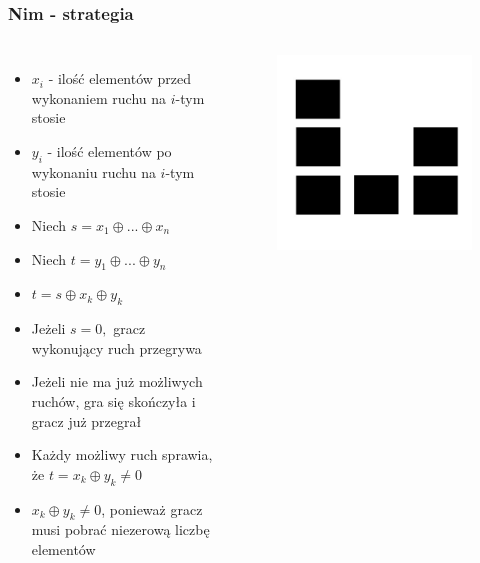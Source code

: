 \documentclass[polish,envcountsect,10pt]{beamer}
\begin{document}
                \begin{frame}
                    \frametitle{Nim - strategia}
                    \begin{columns}
                            \begin{itemize}
                                \item<1-> $x_i$ - ilość elementów przed wykonaniem ruchu na $i$-tym stosie
                                \item<1-> $y_i$ - ilość elementów po wykonaniu ruchu na $i$-tym stosie
                                \item<1-> Niech $s = x_1 \oplus ... \oplus x_n$
                                \item<1-> Niech $t = y_1 \oplus ... \oplus y_n$
                                \item<1-> $t = s \oplus x_k \oplus y_k$
                                \item<2-> Jeżeli $s = 0,$ gracz wykonujący ruch przegrywa
                                \item<3-> Jeżeli nie ma już możliwych ruchów, gra się skończyła i gracz już przegrał
                                \item<4-> Każdy możliwy ruch sprawia, że $t = x_k \oplus y_k \neq 0$
                                \item<5-> $x_k \oplus y_k \neq 0$, ponieważ gracz musi pobrać niezerową liczbę elementów
                            \end{itemize}
                        \begin{figure}[H]
                            \centering
                            \includegraphics[width=\textwidth]{images/nimsuma0.jpg}                            
                        \end{figure}
                    \end{columns}
                \end{frame}
\end{document}
